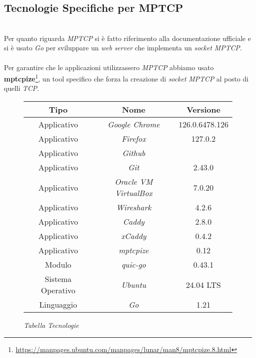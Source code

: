 \subsection{Tecnologie Specifiche per MPTCP}
~\\
Per quanto riguarda \emph{MPTCP} si è fatto riferimento alla documentazione ufficiale \cite{site:mptcp-code} e si è usato \emph{Go} per sviluppare un \emph{web server} che implementa un \emph{socket MPTCP}.
\\\\
Per garantire che le applicazioni utilizzassero \emph{MPTCP} abbiamo usato \textbf{mptcpize}\footnote{\url{https://manpages.ubuntu.com/manpages/lunar/man8/mptcpize.8.html}}, un tool specifico che forza la creazione di \emph{socket MPTCP} al posto di quelli \emph{TCP}.
\hfill
\begin{figure}[!h]
    \centering
    \begin{tabular}{|c|c|c|}
        \hline
        \textbf{Tipo} & \textbf{Nome} & \textbf{Versione} \\
        \hline
        Applicativo & \emph{Google Chrome} & 126.0.6478.126 \\
        \hline
        Applicativo & \emph{Firefox} & 127.0.2 \\
        \hline
        Applicativo & \emph{Github} &  \\
        \hline
        Applicativo & \emph{Git} & 2.43.0 \\
        \hline
        Applicativo & \emph{Oracle VM VirtualBox} & 7.0.20 \\
        \hline
        Applicativo & \emph{Wireshark} & 4.2.6 \\
        \hline
        Applicativo & \emph{Caddy} & 2.8.0 \\
        \hline
        Applicativo & \emph{xCaddy} & 0.4.2 \\
        \hline
        Applicativo & \emph{mptcpize} & 0.12 \\
        \hline
        Modulo & \emph{quic-go} &  0.43.1 \\
        \hline
        Sistema Operativo & \emph{Ubuntu} & 24.04 LTS \\
        \hline
        Linguaggio & \emph{Go} & 1.21 \\
        \hline
    \end{tabular}
    \caption{\emph{Tabella Tecnologie}}
    \label{table-tecnologie}
\end{figure}

\pagebreak

